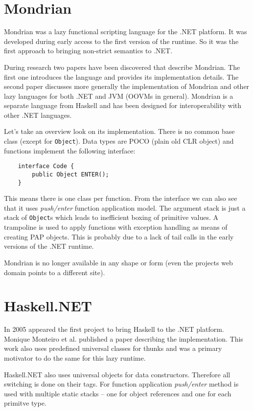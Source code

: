 \documentclass[en]{pracamgr}
\begin{document}
\section{Mondrian}

Mondrian was a lazy functional scripting language for
the .NET platform. It was developed during early access
to the first version of the runtime.
So it was the first approach to bringing non-strict
semantics to .NET.

During research two papers have been discovered that
describe Mondrian. The first one \cite{MondrianImplDetails}
introduces the language and provides its implementation details.
The second paper \cite{PerryMeijer} discusses more generally
the implementation of Mondrian and other lazy languages
for both .NET and JVM (OOVMs in general).
Mondrian is a separate language from Haskell and has
been designed for interoperability with other .NET languages.

Let's take an overview look on its implementation.
There is no common base class (except for \texttt{Object}).
Data types are POCO (plain old CLR object) and functions
implement the following interface:
\begin{verbatim}
    interface Code {
        public Object ENTER();
    }
\end{verbatim}

This means there is one class per function.
From the interface we can also see that it uses
\textit{push/enter} function application model.
The argument stack is just a stack of \texttt{Object}s
which leads to inefficient boxing of primitive values.
A trampoline is used to apply functions with exception handling
as means of creating PAP objects.
This is probably due to a lack of tail calls in the early
versions of the .NET runtime.

Mondrian is no longer available in any shape or form (even the projects web domain points to a different site).

\section{Haskell.NET}

In 2005 appeared the first project to bring Haskell
to the .NET platform.
Monique Monteiro et al. published a paper \cite{Brazil}
describing the implementation. This work also
uses predefined universal classes for thunks and was
a primary motivator to do the same for this lazy runtime.

Haskell.NET also uses universal objects for data constructors.
Therefore all switching is done on their tags.
For function application \textit{push/enter} method is used
with multiple static stacks -- one for object references and
one for each primitve type.
\end{document}
